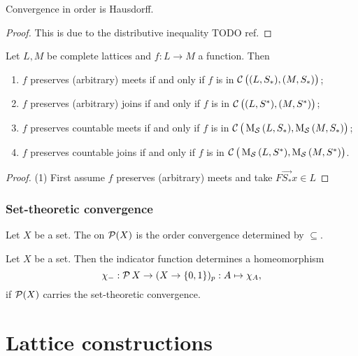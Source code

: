 \begin{proposition}
Convergence in order is Hausdorff.
\end{proposition}
\begin{proof}
This is due to the distributive inequality TODO ref.
\end{proof}

\begin{proposition}
Let $L, M$ be complete lattices and $f: L\to M$ a function. Then
\begin{enumerate}
\item $f$ preserves (arbitrary) meets \textup{if and only if} $f$ is in $\cont\big(\sSet{L, S_*}, \sSet{M, S_*}\big)$;
\item $f$ preserves (arbitrary) joins \textup{if and only if} $f$ is in $\cont\big(\sSet{L, S^*}, \sSet{M, S^*}\big)$;
\item $f$ preserves countable meets \textup{if and only if} $f$ is in $\cont\big(\seqMod\sSet{L, S_*}, \seqMod\sSet{M, S_*}\big)$;
\item $f$ preserves countable joins \textup{if and only if} $f$ is in $\cont\big(\seqMod\sSet{L, S^*}, \seqMod\sSet{M, S^*}\big)$.
\end{enumerate}
\end{proposition}
\begin{proof}
(1) First assume $f$ preserves (arbitrary) meets and take $F\overset{\longrightarrow}{S_*}x\in L$
\end{proof}

\subsection{Set-theoretic convergence}
\begin{definition}
Let $X$ be a set. The  on $\operatorname{\mathcal{P}}(X)$ is the order convergence determined by $\subseteq$.
\end{definition}

\begin{lemma} \label{indicatorFunctionHomeomorphism}
Let $X$ be a set. Then the indicator function determines a homeomorphism
\[ \chi_{-}: \operatorname{\mathcal{P}}{X} \to (X\to \{0,1\})_p: A\mapsto \chi_{A}, \]
if $\operatorname{\mathcal{P}}(X)$ carries the set-theoretic convergence.
\end{lemma}



\chapter{Lattice constructions}

